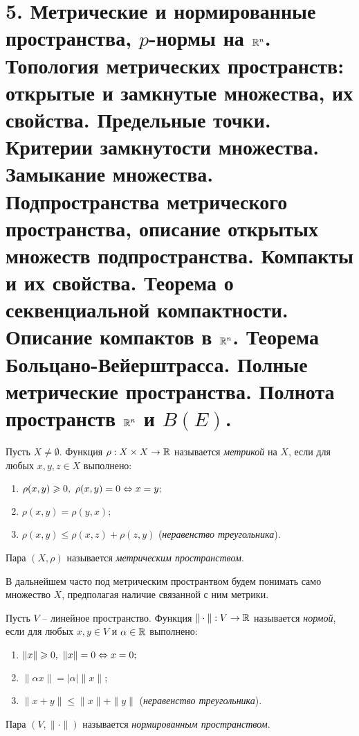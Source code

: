 \section{5. Метрические и нормированные пространства, $p$-нормы на $\mathbb{R}^{n}$. Топология метрических пространств: открытые и замкнутые множества, их свойства. Предельные точки. Критерии замкнутости множества. Замыкание множества. Подпространства метрического пространства, описание открытых множеств подпространства. Компакты и их свойства. Теорема о секвенциальной компактности. Описание компактов в $\mathbb{R}^{n}$. Теорема Больцано-Вейерштрасса. Полные метрические пространства. Полнота пространств $\mathbb{R}^{n}$ и $B(E)$.}

\begin{definition}
    Пусть $X \not= \emptyset$. Функция $\rho: X \times X \to \mathbb{R}$ называется \textit{метрикой} на $X$, если для любых $x, y, z \in X$ выполнено:
    
    \begin{enumerate}
        \item $\rho(x, y) \geqslant 0, \ \rho(x, y) = 0 \Leftrightarrow x = y;$
        \item $\rho(x, y) = \rho(y, x);$
        \item $\rho(x, y) \leq \rho(x, z) + \rho(z, y)$ (\textit{неравенство треугольника}).
    \end{enumerate}

    Пара $(X, \rho)$ называется \textit{метрическим пространством}.
\end{definition}

В дальнейшем часто под метрическим пространтвом будем понимать само множество $X$, предполагая наличие связанной с ним метрики.

\begin{definition}
    Пусть $V$ -- линейное пространство. Функция $\|\cdot\|: V \to \mathbb{R}$ называется \textit{нормой}, если для любых $x, y \in V$ и $\alpha \in \mathbb{R}$ выполнено:

    \begin{enumerate}
        \item $\|x\| \geqslant 0, \ \|x\| = 0 \Leftrightarrow x = 0;$
        \item $\|\alpha x\| = |\alpha|\|x\|;$
        \item $\|x + y\| \leq \|x\| + \|y\|$ (\textit{неравенство треугольника}).
    \end{enumerate}

    Пара $(V, \|\cdot\|)$ называется \textit{нормированным пространством}.
\end{definition}

